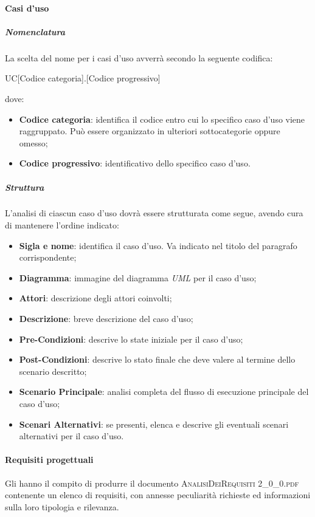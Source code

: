 		\paragraph{Casi d'uso}
		
			\subparagraph{Nomenclatura}
			La scelta del nome per i casi d'uso avverrà secondo la seguente codifica:
			\begin{center}
				UC[Codice categoria].[Codice progressivo]
			\end{center}
			dove:
			\begin{itemize}
				\item\textbf{Codice categoria}: identifica il codice entro cui lo specifico caso d'uso viene raggruppato. Può essere organizzato in ulteriori sottocategorie oppure omesso;
				\item\textbf{Codice progressivo}: identificativo dello specifico caso d'uso.
			\end{itemize}
			
			\subparagraph{Struttura}
			L'analisi di ciascun caso d'uso dovrà essere strutturata come segue, avendo cura di mantenere l'ordine indicato:
			\begin{itemize}
				\item\textbf{Sigla e nome}: identifica il caso d'uso. Va indicato nel titolo del paragrafo corrispondente;
				\item\textbf{Diagramma}: immagine del diagramma \textit{UML} per il caso d'uso;
				\item\textbf{Attori}: descrizione degli attori coinvolti;
				\item\textbf{Descrizione}: breve descrizione del caso d'uso;
				\item\textbf{Pre-Condizioni}: descrive lo state iniziale per il caso d'uso;
				\item\textbf{Post-Condizioni}: descrive lo stato finale che deve valere al termine dello scenario descritto;
				\item\textbf{Scenario Principale}: analisi completa del flusso di esecuzione principale del caso d'uso;
				\item\textbf{Scenari Alternativi}: se presenti, elenca e descrive gli eventuali scenari alternativi per il caso d'uso.
			\end{itemize}
		
		\paragraph{Requisiti progettuali}
		Gli \textit{\Anas} hanno il compito di produrre il documento \textsc{AnalisiDeiRequisiti 2\_0\_0.pdf} contenente un elenco di requisiti, con annesse peculiarità richieste ed informazioni sulla loro tipologia e rilevanza.
		
